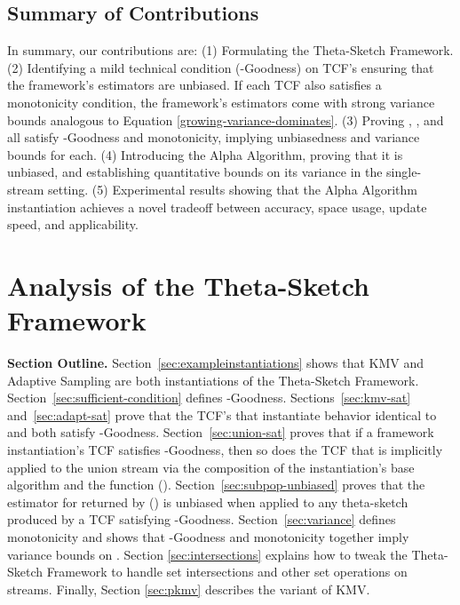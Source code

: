 \documentclass{article}
\begin{document}
\subsection{Summary of Contributions}
\label{sec:contributions}
In summary, our contributions are: (1) Formulating the Theta-Sketch Framework. (2) Identifying a mild technical condition (-Goodness) on TCF's ensuring that the framework's estimators 
are unbiased. If each TCF also satisfies a monotonicity condition, the framework's estimators come with strong variance bounds analogous to Equation \eqref{growing-variance-dominates}. 
(3) Proving , , and  all satisfy -Goodness and monotonicity, implying unbiasedness and variance bounds for each.
(4) Introducing the Alpha Algorithm, proving that it is unbiased, 
and establishing quantitative bounds on its variance in the single-stream setting.
(5) Experimental results showing that the Alpha Algorithm instantiation achieves a novel tradeoff between accuracy, space usage, update speed, and applicability.



\section{Analysis of the Theta-Sketch Framework}
\label{sec:framework}
\noindent \textbf{Section Outline.} 
Section~\ref{sec:exampleinstantiations} shows that KMV and Adaptive Sampling are both instantiations of the Theta-Sketch Framework.
Section~\ref{sec:sufficient-condition} defines -Goodness.
Sections~\ref{sec:kmv-sat} and~\ref{sec:adapt-sat} prove that the TCF's 
that instantiate behavior identical to  and  both satisfy -Goodness.
Section~\ref{sec:union-sat} proves that if a framework instantiation's
TCF satisfies -Goodness, then so does the TCF that is implicitly applied to the union stream via the composition of the 
instantiation's base algorithm and the function (). 
Section~\ref{sec:subpop-unbiased} proves that the estimator  for  returned by ()
is unbiased when applied to any theta-sketch produced by a TCF
satisfying -Goodness. Section~\ref{sec:variance} defines monotonicity and shows that -Goodness and monotonicity together imply variance bounds on . Section \ref{sec:intersections} explains how to tweak the Theta-Sketch Framework
to handle set intersections and other set operations on streams.
Finally, Section \ref{sec:pkmv} describes the  variant of KMV. 
\end{document}
